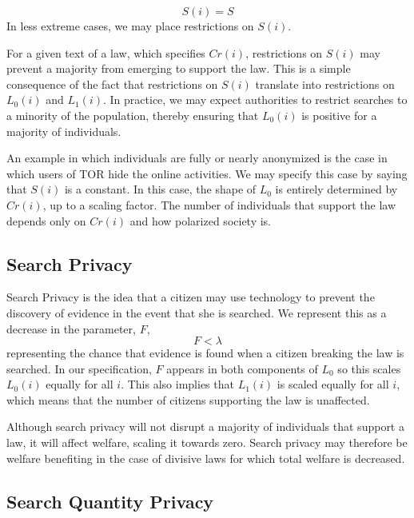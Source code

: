 $$S(i)=S$$ In less extreme cases, we may place restrictions on $S(i)$.

For a given text of a law, which specifies $Cr(i)$, restrictions on $S(i)$ may prevent a majority from emerging to support the law.  This is a simple consequence of the fact that restrictions on $S(i)$ translate into restrictions on $L_0(i)$ and $L_1(i)$.  In practice, we may expect authorities to restrict searches to a minority of the population, thereby ensuring that $L_0(i)$ is positive for a majority of individuals.

An example in which individuals are fully or nearly anonymized is the case in which users of TOR hide the online activities.  We may specify this case by saying that $S(i)$ is a constant.  In this case, the shape of $L_0$ is entirely determined by $Cr(i)$, up to a scaling factor.  The number of individuals that support the law depends only on $Cr(i)$ and how polarized society is.

\subsection{Search Privacy}

Search Privacy is the idea that a citizen may use technology to prevent the discovery of evidence in the event that she is searched.  We represent this as a decrease in the parameter, $F$, 
$$F<\lambda$$
representing the chance that evidence is found when a citizen breaking the law is searched.  In our specification, $F$ appears in both components of $L_0$ so this scales $L_0(i)$ equally for all $i$.  This also implies that $L_1(i)$ is scaled equally for all $i$, which means that the number of citizens supporting the law is unaffected.

Although search privacy will not disrupt a majority of individuals that support a law, it will affect welfare, scaling it towards zero.  Search privacy may therefore be welfare benefiting in the case of divisive laws for which total welfare is decreased.

\subsection{Search Quantity Privacy}

